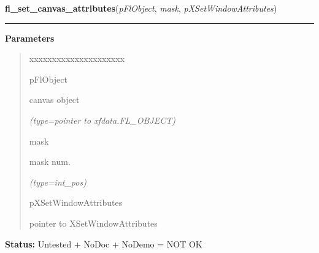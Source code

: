 \hspace{.8\funcindent}\begin{boxedminipage}{\funcwidth}

    \raggedright \textbf{fl\_set\_canvas\_attributes}(\textit{pFlObject}, \textit{mask}, \textit{pXSetWindowAttributes})

    \vspace{-1.5ex}

    \rule{\textwidth}{0.5\fboxrule}
\setlength{\parskip}{2ex}
\setlength{\parskip}{1ex}
      \textbf{Parameters}
      \vspace{-1ex}

      \begin{quote}
        \begin{Ventry}{xxxxxxxxxxxxxxxxxxxxx}

          \item[pFlObject]

          canvas object

            {\it (type=pointer to xfdata.FL\_OBJECT)}

          \item[mask]

          mask num.

            {\it (type=int\_pos)}

          \item[pXSetWindowAttributes]

          pointer to XSetWindowAttributes

        \end{Ventry}

      \end{quote}

\textbf{Status:} Untested + NoDoc + NoDemo = NOT OK



    \end{boxedminipage}

    \label{xformslib:flcanvas:fl_add_canvas_handler}

    \vspace{0.5ex}

